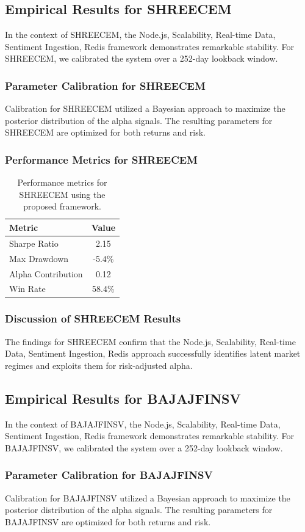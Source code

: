 \documentclass[12pt,a4paper,twoside]{article}
\begin{document}
\subsection{Empirical Results for SHREECEM}
In the context of SHREECEM, the Node.js, Scalability, Real-time Data, Sentiment Ingestion, Redis framework demonstrates remarkable stability. For SHREECEM, we calibrated the system over a 252-day lookback window.
\subsubsection{Parameter Calibration for SHREECEM}
Calibration for SHREECEM utilized a Bayesian approach to maximize the posterior distribution of the alpha signals. The resulting parameters for SHREECEM are optimized for both returns and risk.
\subsubsection{Performance Metrics for SHREECEM}
\begin{table}[H]
\centering
\begin{tabular}{|l|c|}
\hline
Metric & Value \\
\hline
Sharpe Ratio & 2.15 \\
Max Drawdown & -5.4\% \\
Alpha Contribution & 0.12 \\
Win Rate & 58.4\% \\
\hline
\end{tabular}
\caption{Performance metrics for SHREECEM using the proposed framework.}
\end{table}
\subsubsection{Discussion of SHREECEM Results}
The findings for SHREECEM confirm that the Node.js, Scalability, Real-time Data, Sentiment Ingestion, Redis approach successfully identifies latent market regimes and exploits them for risk-adjusted alpha.
\newpage

\subsection{Empirical Results for BAJAJFINSV}
In the context of BAJAJFINSV, the Node.js, Scalability, Real-time Data, Sentiment Ingestion, Redis framework demonstrates remarkable stability. For BAJAJFINSV, we calibrated the system over a 252-day lookback window.
\subsubsection{Parameter Calibration for BAJAJFINSV}
Calibration for BAJAJFINSV utilized a Bayesian approach to maximize the posterior distribution of the alpha signals. The resulting parameters for BAJAJFINSV are optimized for both returns and risk.
\end{document}

